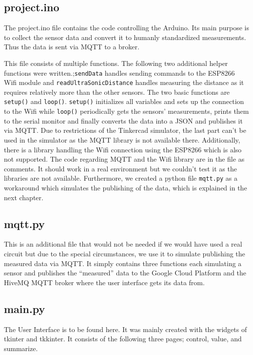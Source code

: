 \documentclass{article}
\begin{document}
\subsection{project.ino}
The project.ino file contains the code controlling the Arduino. Its main purpose is to collect the sensor data and convert it to humanly standardized measurements. Thus the data is sent via MQTT to a broker. \par
This file consists of multiple functions. The following two additional helper functions were written.;\texttt{sendData} handles sending commands to the ESP8266 Wifi module and \texttt{readUltraSonicDistance} handles measuring the distance as it requires relatively more than the other sensors. The two basic functions are \texttt{setup()} and \texttt{loop()}. \texttt{setup()} initializes all variables and sets up the connection to the Wifi while \texttt{loop()} periodically gets the sensors' measurements, prints them to the serial monitor and finally converts the data into a JSON and publishes it via MQTT. Due to restrictions of the Tinkercad simulator, the last part can't be used in the simulator as the MQTT library is not available there. Additionally, there is a library handling the Wifi connection using the ESP8266 which is also not supported. The code regarding MQTT and the Wifi library are in the file as comments. It should work in a real environment but we couldn't test it as the libraries are not available. Furthermore, we created a python file \texttt{mqtt.py} as a workaround which simulates the publishing of the data, which is explained in the next chapter.\par
\subsection{mqtt.py}
This is an additional file that would not be needed if we would have used a real circuit but due to the special circumstances, we use it to simulate publishing the measured data via MQTT. It simply contains three functions each simulating a sensor and publishes the \enquote{measured} data to the Google Cloud Platform and the HiveMQ MQTT broker where the user interface gets its data from.
\subsection{main.py}
The User Interface is to be found here. It was mainly created with the widgets of tkinter and tkkinter. It consists of the following three pages; control, value, and summarize.
\end{document}

